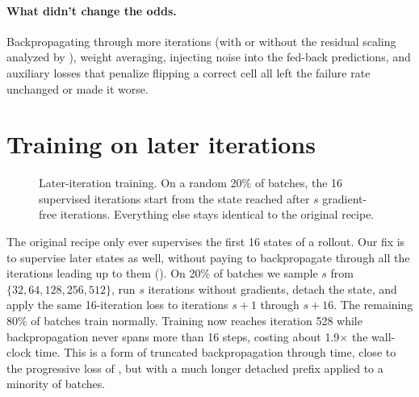 \paragraph{What didn't change the odds.} Backpropagating through more iterations (with or without the residual scaling analyzed by \citet{wang2026loopmup}), weight averaging, injecting noise into the fed-back predictions, and auxiliary losses that penalize flipping a correct cell all left the failure rate unchanged or made it worse.

\section{Training on later iterations}
\label{sec:late}

\begin{figure}[t]
\centering
{}
\caption{Later-iteration training. On a random 20\% of batches, the 16 supervised iterations start from the state reached after $s$ gradient-free iterations. Everything else stays identical to the original recipe.}
\label{fig:method}
\end{figure}

The original recipe only ever supervises the first 16 states of a rollout. Our fix is to supervise later states as well, without paying to backpropagate through all the iterations leading up to them (). On 20\% of batches we sample $s$ from $\{32, 64, 128, 256, 512\}$, run $s$ iterations without gradients, detach the state, and apply the same 16-iteration loss to iterations $s{+}1$ through $s{+}16$. The remaining 80\% of batches train normally. Training now reaches iteration 528 while backpropagation never spans more than 16 steps, costing about 1.9$\times$ the wall-clock time. This is a form of truncated backpropagation through time, close to the progressive loss of \citet{bansal2022end}, but with a much longer detached prefix applied to a minority of batches.

